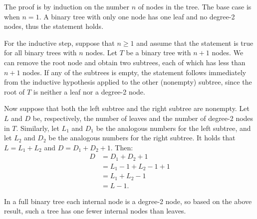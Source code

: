 \exercise
The proof is by induction on the number $n$ of nodes in the tree.
The base case is when $n=1$.
A binary tree with only one node has one leaf and no degree-2 nodes, thus the statement holds.

For the inductive step, suppose that $n\ge1$ and assume that the statement is true for all binary trees with $n$ nodes.
Let $T$ be a binary tree with $n+1$ nodes.
We can remove the root node and obtain two subtrees, each of which has less than $n+1$ nodes.
If any of the subtrees is empty, the statement follows immediately from the inductive hypothesis applied to the other (nonempty) subtree, since the root of $T$ is neither a leaf nor a degree-2 node.

Now suppose that both the left subtree and the right subtree are nonempty.
Let $L$ and $D$ be, respectively, the number of leaves and the number of degree-2 nodes in $T$.
Similarly, let $L_1$ and $D_1$ be the analogous numbers for the left subtree, and let $L_2$ and $D_2$ be the analogous numbers for the right subtree.
It holds that $L=L_1+L_2$ and $D=D_1+D_2+1$.
Then:
\begin{align*}
    D &= D_1+D_2+1 \\
    &= L_1-1+L_2-1+1 \tag{by the inductive hypothesis} \\
    &= L_1+L_2-1 \\
    &= L-1.
\end{align*}

In a full binary tree each internal node is a degree-2 node, so based on the above result, such a tree has one fewer internal nodes than leaves.
